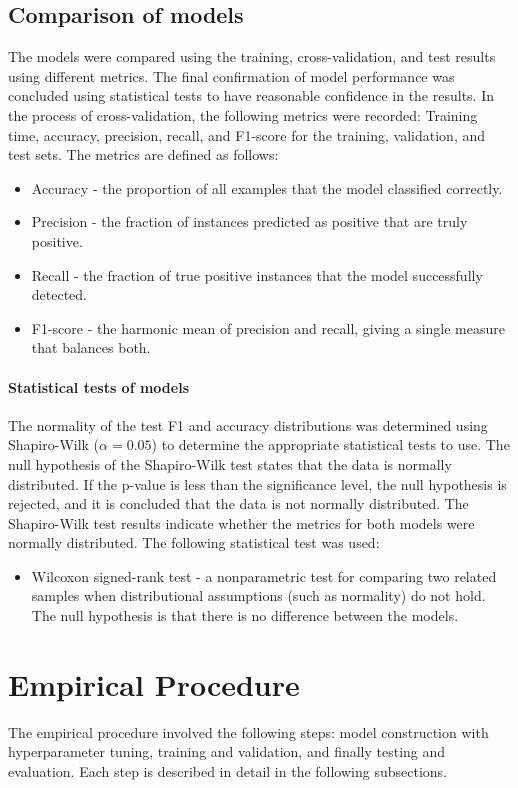 \documentclass[conference]{IEEEtran}
\begin{document}
\subsection{Comparison of models}
The models were compared using the training, cross-validation, and test results using different metrics. The final confirmation of model performance was concluded using statistical tests to have 
reasonable confidence in the results. In the process of cross-validation, the following metrics were recorded:
 Training time, accuracy, precision, recall, and F1-score for the training, validation, and test sets. The metrics are 
defined as follows:
\begin{itemize}
  \item Accuracy - the proportion of all examples that the model classified correctly.
  \item Precision - the fraction of instances predicted as positive that are truly positive.
  \item Recall - the fraction of true positive instances that the model successfully detected.
  \item F1-score - the harmonic mean of precision and recall, giving a single measure that balances both.
\end{itemize}

\paragraph{Statistical tests of models}
The normality of the test F1 and accuracy distributions was determined using Shapiro-Wilk ($\alpha{=}0.05$) to determine the appropriate statistical tests to use.
 The null hypothesis of the Shapiro-Wilk test states that the data is normally distributed. If the p-value is less than the significance level, the null hypothesis is rejected, and it is concluded that the data is not normally distributed. The Shapiro-Wilk test results indicate whether the metrics 
 for both models were normally distributed. The following statistical test was used:
\begin{itemize}
\item Wilcoxon signed-rank test - a nonparametric test for comparing two related samples when distributional assumptions (such as normality) do not hold. The null hypothesis is that there is no difference between the models.
\end{itemize}


\section{Empirical Procedure}
The empirical procedure involved the following steps: model construction with hyperparameter tuning, training and validation, and finally testing and evaluation. Each step is described in detail in the following subsections.
\end{document}
